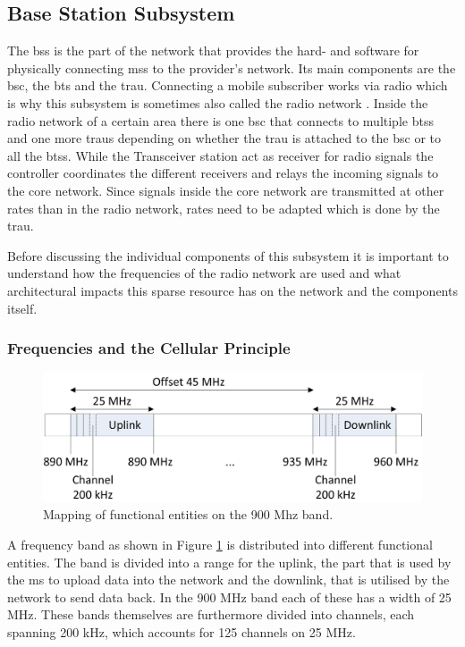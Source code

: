\subsection{Base Station Subsystem}
\label{sec:bss}
The \gls{bss} is the part of the network that provides the hard- and software for physically connecting \glspl{ms} to the provider's network.
Its main components are the \gls{bsc}, the \gls{bts} and the \gls{trau}.
Connecting a mobile subscriber works via radio which is why this subsystem is sometimes also called the radio network \cite{kommsys2006}.
Inside the radio network of a certain area there is one \gls{bsc} that connects to multiple \glspl{bts} and one more \glspl{trau} depending on whether the \gls{trau} is attached to the \gls{bsc} or to all the \glspl{bts}.
While the Transceiver station act as receiver for radio signals the controller coordinates the different receivers and relays the incoming signals  to the core network.
Since signals inside the core network are transmitted at other rates than in the radio network, rates need to be adapted which is done by the \gls{trau}.

Before discussing the individual components of this subsystem it is important to understand how the frequencies of the radio network are used and what architectural impacts this sparse resource has on the network and the components itself.

\subsubsection{Frequencies and the Cellular Principle}
\begin{figure}
\centering
\includegraphics{../Images/Mapping}
\caption{Mapping of functional entities on the 900 Mhz band.}
\label{fig:frequency}
\end{figure}

A frequency band as shown in Figure \ref{fig:frequency} is distributed into different functional entities.
The band is divided into a range for the uplink, the part that is used by the \gls{ms} to upload data into the network and the downlink, that is utilised by the network to send data back.
In the 900 MHz band each of these has a width of 25 MHz.
These bands themselves are furthermore divided into channels, each spanning 200 kHz, which accounts for 125 channels on 25 MHz.

